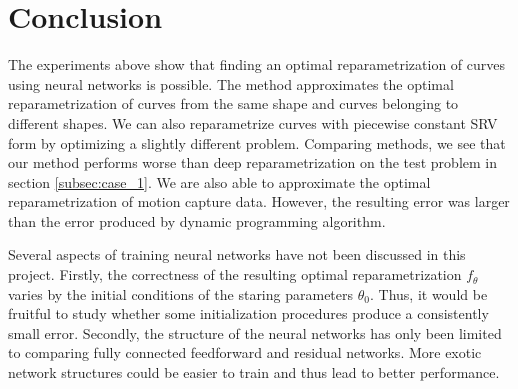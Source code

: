 \section{Conclusion}
The experiments above show that finding an optimal reparametrization of curves using neural networks is possible. The method approximates the optimal reparametrization of curves from the same shape and curves belonging to different shapes. We can also reparametrize curves with piecewise constant SRV form by optimizing a slightly different problem. Comparing methods, we see that our method performs worse than deep reparametrization \cite{jørgen2021} on the test problem in section \ref{subsec:case_1}. We are also able to approximate the optimal reparametrization of motion capture data. However, the resulting error was larger than the error produced by dynamic programming algorithm\cite{lystad2019}.

Several aspects of training neural networks have not been discussed in this project. Firstly, the correctness of the resulting optimal reparametrization \(f_\theta\) varies by the initial conditions of the staring parameters \(\theta_0\). Thus, it would be fruitful to study whether some initialization procedures produce a consistently small error. Secondly, the structure of the neural networks has only been limited to comparing fully connected feedforward and residual networks. More exotic network structures could be easier to train and thus lead to better performance.